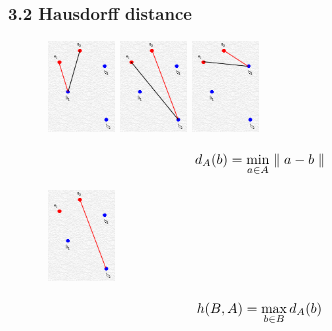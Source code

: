 \documentclass[notheorems,serif,table,compress]{beamer}  %
\begin{document}
\begin{frame}
\frametitle{3.2 Hausdorff distance}
   \begin{figure}[!ht]
    \begin{minipage}{0.3\textwidth}
    \centering
    \includegraphics[width=0.7in]{dian223.png}
    \end{minipage}
    \begin{minipage}{0.3\textwidth}
    \centering
    \includegraphics[width=0.7in]{dian222.png}
    \end{minipage}
    \begin{minipage}{0.3\textwidth}
    \centering
    \includegraphics[width=0.7in]{dian221.png}
    \end{minipage}
   \end{figure}
   \begin{displaymath}
d_{A}(b)=\min_{\begin{subarray}{l}
              a\in A
               \end{subarray}}
        \parallel a-b \parallel
\end{displaymath}
   \begin{figure}[!ht]
    \centering
    \includegraphics[width=0.7in]{dian42.png}
   \end{figure}
   \begin{displaymath}
h(B,A)=\max_{\begin{subarray}{l}
              b\in B
               \end{subarray}}
       d_{A}(b)
\end{displaymath}
\end{frame}
\end{document}
